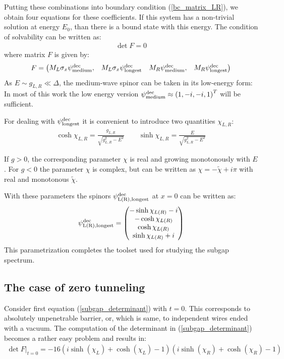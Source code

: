  Putting these combinations into boundary condition (\ref{bc_matrix_LR}), we obtain four equations for these coefficients. If this system has a non-trivial solution at energy $ E_0 $, than there is a bound state with this energy. The condition of solvability can be written as:
\begin{gather}
\label{subgap_determinant}
	\det F = 0
\end{gather}
where matrix $ F $ is given by:
\begin{gather}
F
=
	\begin{pmatrix}
	M_L \sigma_x 
	\wf{dec}{\medium}
	,
	&
	M_L 
	\sigma_x
	\wf{dec}{\verylong}
	&
	M_R
	\wf{dec}{\medium},
	&
	M_R
	\wf{dec}{\verylong}
	\end{pmatrix}
\end{gather}
As $ E\sim g_{L,R}\ll\Delta $, the medium-wave spinor can be taken in its low-energy form: 
In most of this work the low energy version $\wf{dec}{\medium}\approx
\br{
	1,
	- i,
	- i,
	1
}^T
 $
will be sufficient.

For dealing with $ \wf{dec}{\verylong} $ it is convenient to introduce two quantities $ \chi_{L,R} $:
\begin{gather}
\cosh\chi_{L,R}
=
\frac{g_{L,R}}{\sqrt{g^2_{L,R}-E^2}}
\qquad
\sinh\chi_{L,R}
=
\frac{E}{\sqrt{g^2_{L,R}-E^2}}
\end{gather}

If $ g>0 $, the corresponding parameter $ \chi $ is real and  growing monotonously with $ E $. For $ g<0 $ the parameter $ \chi $ is complex, but can be written as $ \chi=-\tilde{\chi}+i\pi $ with real and monotonous $\tilde{\chi}  $.

With these parameters the spinors $ \wf{dec}{L\br{R},\verylong} $ at $ x=0 $ can be written as:
\begin{gather}
\wf{dec}{L\br{R},\verylong}
=
	\begin{pmatrix}
	-\sinh \chi_{L\br{R}} -i
	\\
	-\cosh \chi_{L\br{R}}
	\\
	\cosh \chi_{L\br{R}}
	\\
	\sinh \chi_{L\br{R}} +i
	\end{pmatrix}
\end{gather}
This parametrization completes the toolset used for studying the subgap spectrum.

\subsection{The case of zero tunneling}
\label{subsect:zero_tunnel}
Consider first  equation (\ref{subgap_determinant}) with $ t=0 $. This corresponds to absolutely unpenetrable barrier, or, which is same, to independent wires ended with a vacuum. The computation of the determinant in (\ref{subgap_determinant}) becomes a rather easy problem and results in:
\begin{gather}
\label{det_bound_States_zero_t}
	\det F
	\Big|_{t=0}
	=
	-16 \left(i \sinh \left(\chi _L\right)+\cosh \left(\chi _L\right)-1\right) \left(i \sinh \left(\chi _R\right)+\cosh \left(\chi _R\right)-1\right)
\end{gather}

